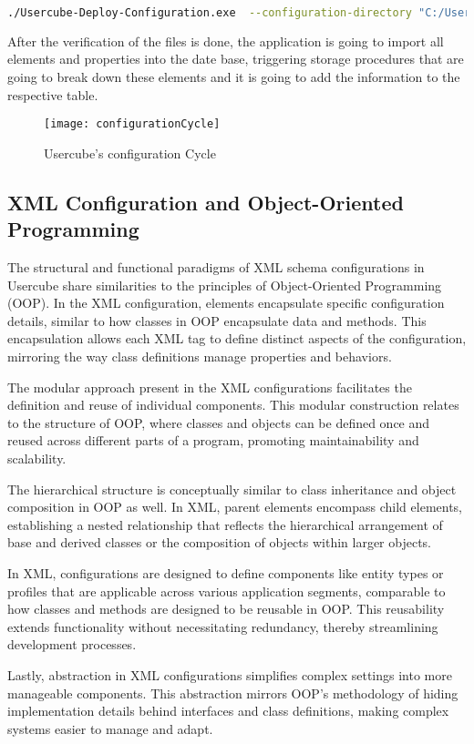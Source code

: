 \begin{lstlisting}[language=sh, caption=Shell command to execute the configuration delpoy]
./Usercube-Deploy-Configuration.exe  --configuration-directory "C:/Usercube/ExportedConf"
\end{lstlisting}

After the verification of the files is done, the application is going to import all elements and properties into the date base, triggering storage procedures that are going to break down these elements and it is going to add the information to the respective table.

\begin{figure}[htbp]
  \centering
  \texttt{[image: configurationCycle]}
  \caption{Usercube's configuration Cycle}
  \label{fig:configurationCycle}
\end{figure}

\subsection{XML Configuration and Object-Oriented Programming}

The structural and functional paradigms of XML schema configurations in Usercube share similarities to the principles of Object-Oriented Programming (OOP). In the XML configuration, elements encapsulate specific configuration details, similar to how classes in OOP encapsulate data and methods. This encapsulation allows each XML tag to define distinct aspects of the configuration, mirroring the way class definitions manage properties and behaviors.

The modular approach present in the XML configurations facilitates the definition and reuse of individual components. This modular construction relates to the structure of OOP, where classes and objects can be defined once and reused across different parts of a program, promoting maintainability and scalability.

The hierarchical structure is conceptually similar to class inheritance and object composition in OOP as well. In XML, parent elements encompass child elements, establishing a nested relationship that reflects the hierarchical arrangement of base and derived classes or the composition of objects within larger objects.

In XML, configurations are designed to define components like entity types or profiles that are applicable across various application segments, comparable to how classes and methods are designed to be reusable in OOP. This reusability extends functionality without necessitating redundancy, thereby streamlining development processes.

Lastly, abstraction in XML configurations simplifies complex settings into more manageable components. This abstraction mirrors OOP’s methodology of hiding implementation details behind interfaces and class definitions, making complex systems easier to manage and adapt.
